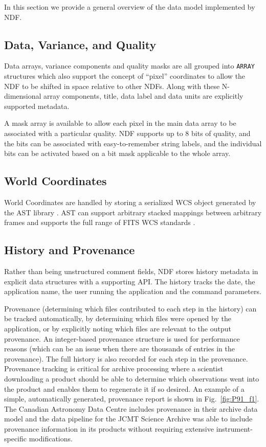 \documentclass[11pt,twoside]{article}
\begin{document}
In this section we provide a general overview of the data model
implemented by NDF.

\subsection{Data, Variance, and Quality}

Data arrays, variance components and quality masks are all grouped
into \texttt{ARRAY} structures which also support the concept of
``pixel'' coordinates to allow the NDF to be shifted in space relative
to other NDFs. Along with these N-dimensional array components, title,
data label and data units are explicitly supported metadata.

A mask array is available to allow each pixel in the main data array
to be associated with a particular quality. NDF supports up to 8 bits
of quality, and the bits can be associated with easy-to-remember
string labels, and the individual bits can be activated based on a bit
mask applicable to the whole array.

\subsection{World Coordinates}

World Coordinates are handled by storing a serialized WCS object
generated by the AST library \citep{1998ASPC..145...41W}. AST can
support arbitrary stacked mappings between arbitrary frames and
supports the full range of FITS WCS standards \citep[see
e.g.][]{2012ASPC..461..825B}.

\subsection{History and Provenance}

Rather than being unstructured comment fields, NDF stores history
metadata in explicit data structures with a supporting API. The
history tracks the date, the application name, the user running the
application and the command parameters.

Provenance (determining which files contributed to each step in the
history) can be tracked automatically, by determining which files were
opened by the application, or by explicitly noting which files are
relevant to the output provenance. An integer-based provenance
structure is used for performance reasons (which can be an issue when
there are thousands of entries in the provenance). The full history is
also recorded for each step in the provenance. Provenance tracking is
critical for archive processing where a scientist downloading a
product should be able to determine which observations went into the
product and enables them to regenerate it if so desired. An example of
a simple, automatically generated, provenance report is shown in Fig.\
\ref{fig:P91_f1}. The Canadian Astronomy Data Centre includes
provenance in their archive data model \citep[CAOM;][]{P25_adassxxii}
and the data pipeline for the JCMT Science Archive
\citep{2008ASPC..394..565J} was able to include provenance information
in its products without requiring extensive instrument-specific
modifications.
\end{document}
